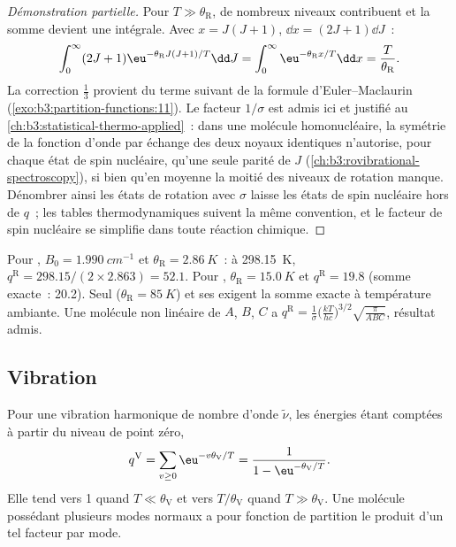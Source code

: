 \begin{proof}[Démonstration partielle]
Pour $T \gg \theta_{\mathrm R}$, de nombreux niveaux contribuent et la
somme devient une intégrale.
Avec $x = J(J+1)$, $\dd x = (2J+1)\dd J$~:
\[
  \int_0^\infty(2J+1)\eu^{-\theta_{\mathrm R}J(J+1)/T}\dd J = \int_0^\infty\eu^{-\theta_{\mathrm R}x/T}\dd x
  = \frac{T}{\theta_{\mathrm R}}.
\]
La correction $\frac13$ provient du terme suivant de la formule
d'Euler--Maclaurin
(\cref{exo:b3:partition-functions:11}). Le facteur $1/\sigma$ est admis
ici et justifié au \cref{ch:b3:statistical-thermo-applied}~: dans une
molécule homonucléaire, la symétrie de la fonction d'onde par échange
des deux noyaux identiques n'autorise, pour chaque état de spin
nucléaire, qu'une seule parité de $J$
(\cref{ch:b3:rovibrational-spectroscopy}), si bien qu'en moyenne la
moitié des niveaux de rotation manque. Dénombrer ainsi les états de
rotation avec $\sigma$ laisse les états de spin nucléaire hors de
$q$~; les tables thermodynamiques suivent la même convention, et le
facteur de spin nucléaire se simplifie dans toute réaction chimique.
\end{proof}

Pour , $B_0 = \qty{1.990}{cm^{-1}}$ et $\theta_{\mathrm R} = \qty{2.86}{K}$~: à \qty{298.15}{K},
$q^{\mathrm R} = 298.15/(2\times2.863) = 52.1$. Pour , $\theta_{\mathrm R} = \qty{15.0}{K}$ et
$q^{\mathrm R} = 19.8$ (somme exacte~: 20.2). Seul 
($\theta_{\mathrm R} = \qty{85}{K}$) et ses 
exigent la somme exacte à température ambiante. Une molécule non linéaire
de 
$A$, $B$, $C$ a $q^{\mathrm R} = \frac{1}{\sigma}\bigl(\frac{kT}{hc}\bigr)^{3/2}\sqrt{\frac{\pi}{ABC}}$,
résultat admis.

\subsection*{Vibration}

\begin{proposition}\label{prop:b3:partition-functions:q-vib}
Pour une vibration harmonique de nombre d'onde $\tilde\nu$, les énergies
étant comptées à partir du
niveau de point zéro,
\[
  q^{\mathrm V} = \sum_{v\ge0}\eu^{-v\theta_{\mathrm V}/T} = \frac{1}{1 - \eu^{-\theta_{\mathrm V}/T}} .
\]
Elle tend vers 1 quand $T \ll \theta_{\mathrm V}$ et vers
$T/\theta_{\mathrm V}$ quand $T \gg \theta_{\mathrm V}$. Une molécule
possédant plusieurs modes normaux a pour fonction de partition le produit
d'un tel facteur par mode.
\end{proposition}

